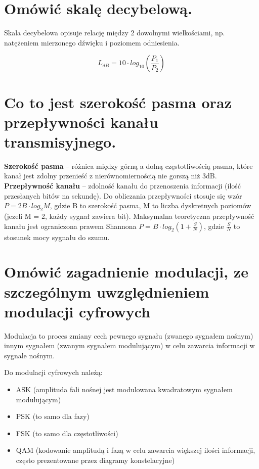 \documentclass[12pt,a4paper]{article}
\begin{document}
	\section{Omówić skalę decybelową.}
	Skala decybelowa opisuje relację między 2 dowolnymi wielkościami, np. natężeniem mierzonego dźwięku i poziomem odniesienia.
	
	$$L_{dB} = 10 \cdot log_{10}\left( \frac{P_1}{P_2} \right) $$

	\section{Co to jest szerokość pasma oraz przepływności kanału transmisyjnego.}
	\textbf{Szerokość pasma} -- różnica między górną a dolną częstotliwością pasma, które kanał jest zdolny przenieść z nierównomiernością nie gorszą niż 3dB.\\
    
	\textbf{Przepływność kanału} -- zdolność kanału do przenoszenia informacji (ilość przesłanych bitów na sekundę). Do obliczania przepływności stosuje się wzór $P = 2B \cdot log_{2}M$, gdzie B to szerokość pasma, M to liczba dyskretnych poziomów (jezeli M = 2, każdy sygnał zawiera bit). Maksymalna teoretyczna przepływność kanału jest ograniczona prawem Shannona $P = B \cdot log_{2}\left( 1+ \frac{S}{N} \right)$, gdzie $\frac{S}{N}$ to stosunek mocy sygnału do szumu.

	\section{Omówić zagadnienie modulacji, ze szczególnym uwzględnieniem modulacji cyfrowych}
	Modulacja to proces zmiany cech pewnego sygnału (zwanego sygnałem nośnym) innym sygnałem (zwanym sygnałem modulującym) w celu zawarcia informacji w sygnale nośnym.
	
	Do modulacji cyfrowych należą: 
	\begin{itemize}
		\item ASK (amplituda fali nośnej jest modulowana kwadratowym sygnałem modulującym)
		\item PSK (to samo dla fazy)
		\item FSK (to samo dla częstotliwości)
		\item QAM (kodowanie amplitudą i fazą w celu zawarcia większej ilości informacji, często prezentowane przez diagramy konstelacyjne)
	\end{itemize}
\end{document}
